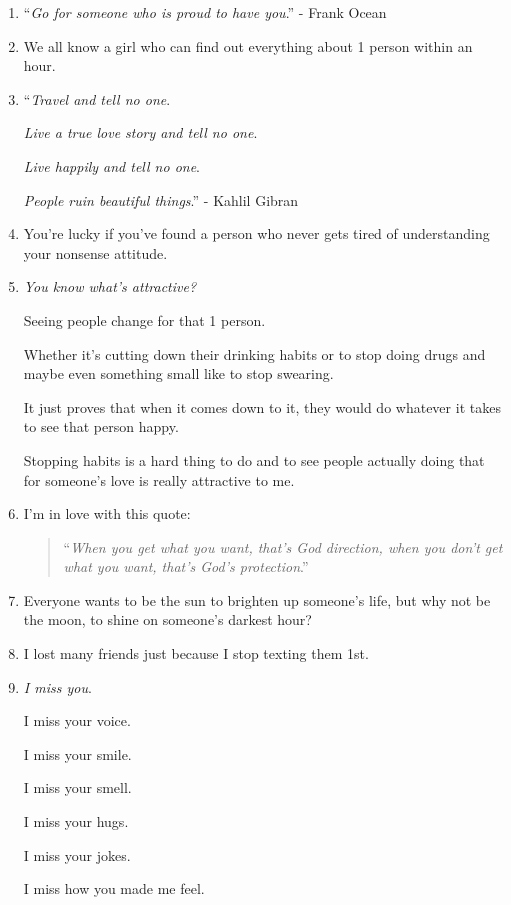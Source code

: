 \documentclass{article}
\numberwithin{equation}{section}
\begin{document}
\begin{enumerate}
    The boy replied: ``No. He was always minding his own business.''
    \item ``\textit{Go for someone who is proud to have you}.'' - Frank Ocean
    \item We all know a girl who can find out everything about 1 person within an hour.
    \item ``\textit{Travel and tell no one}.
    
    \textit{Live a true love story and tell no one}.
    
    \textit{Live happily and tell no one}.
    
    \textit{People ruin beautiful things}.'' - Kahlil Gibran
    \item You're lucky if you've found a person who never gets tired of understanding your nonsense attitude.
    \item \textit{You know what's attractive?}
    
    Seeing people change for that 1 person.
    
    Whether it's cutting down their drinking habits or to stop doing drugs and maybe even something small like to stop swearing.
    
    It just proves that when it comes down to it, they would do whatever it takes to see that person happy.
    
    Stopping habits is a hard thing to do and to see people actually doing that for someone's love is really attractive to me.
    \item I'm in love with this quote:
    \begin{quotation}
        ``\textit{When you get what you want, that's God direction, when you don't get what you want, that's God's protection}.''
    \end{quotation}
    \item Everyone wants to be the sun to brighten up someone's life, but why not be the moon, to shine on someone's darkest hour?
    \item I lost many friends just because I stop texting them 1st.
    \item \textit{I miss you}.
    
    I miss your voice.
    
    I miss your smile.
    
    I miss your smell.
    
    I miss your hugs.
    
    I miss your jokes.
    
    I miss how you made me feel.
    

\end{enumerate}
\end{document}
